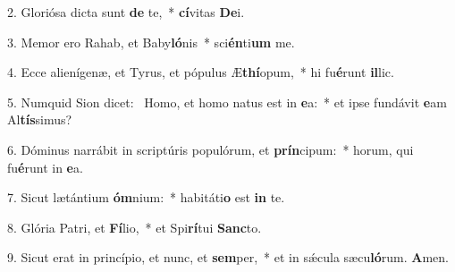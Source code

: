 2. Gloriósa dicta sunt \textbf{de} te,~*  \textbf{cí}vitas \textbf{De}i.\

3. Memor ero Rahab, et Baby\textbf{ló}nis~*  sci\textbf{én}ti\textbf{um} me.\

4. Ecce alienígenæ, et Tyrus, et pópulus Æ\textbf{thí}opum,~*  hi fu\textbf{é}runt \textbf{il}lic.\

5. Numquid Sion dicet: \dag\  Homo, et homo natus est in \textbf{e}a:~*  et ipse fundávit \textbf{e}am Al\textbf{tís}simus?\

6. Dóminus narrábit in scriptúris populórum, et \textbf{prín}cipum:~*  horum, qui fu\textbf{é}runt in \textbf{e}a.\

7. Sicut lætántium \textbf{óm}nium:~*  habitáti\textbf{o} est \textbf{in} te.\

8. Glória Patri, et \textbf{Fí}lio,~*  et Spi\textbf{rí}tui \textbf{Sanc}to.\

9. Sicut erat in princípio, et nunc, et \textbf{sem}per,~*  et in sǽcula sæcu\textbf{ló}rum. \textbf{A}men.\

